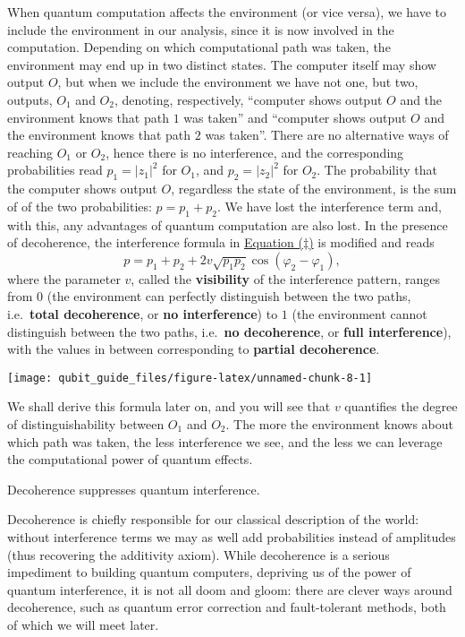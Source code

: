 \documentclass[fleqn]{article}
\newenvironment{idea}{\noindent}{\medskip}
\begin{document}
When quantum computation affects the environment (or vice versa), we have to include the environment in our analysis, since it is now involved in the computation.
Depending on which computational path was taken, the environment may end up in two distinct states.
The computer itself may show output \(O\), but when we include the environment we have not one, but two, outputs, \(O_1\) and \(O_2\), denoting, respectively, ``computer shows output \(O\) and the environment knows that path \(1\) was taken'' and ``computer shows output \(O\) and the environment knows that path \(2\) was taken''.
There are no alternative ways of reaching \(O_1\) or \(O_2\), hence there is no interference, and the corresponding probabilities read \(p_1=|z_1|^2\) for \(O_1\), and \(p_2=|z_2|^2\) for \(O_2\).
The probability that the computer shows output \(O\), regardless the state of the environment, is the sum of of the two probabilities: \(p=p_1+p_2\).
We have lost the interference term and, with this, any advantages of quantum computation are also lost.
In the presence of decoherence, the interference formula in \protect\hyperlink{the-double-slit-experiment}{Equation (\(\ddagger\))} is modified and reads
\[
p = p_1 + p_2 + 2 v \sqrt{p_1 p_2}\cos (\varphi_2-\varphi_1),
\]
where the parameter \(v\), called the \textbf{visibility} of the interference pattern, ranges from \(0\) (the environment can perfectly distinguish between the two paths, i.e.~\textbf{total decoherence}, or \textbf{no interference}) to \(1\) (the environment cannot distinguish between the two paths, i.e.~\textbf{no decoherence}, or \textbf{full interference}), with the values in between corresponding to \textbf{partial decoherence}.

\begin{center}\texttt{[image: qubit\_guide\_files/figure-latex/unnamed-chunk-8-1]} \end{center}

We shall derive this formula later on, and you will see that \(v\) quantifies the degree of distinguishability between \(O_1\) and \(O_2\).
The more the environment knows about which path was taken, the less interference we see, and the less we can leverage the computational power of quantum effects.

\begin{idea}
Decoherence suppresses quantum interference.

\end{idea}

Decoherence is chiefly responsible for our classical description of the world: without interference terms we may as well add probabilities instead of amplitudes (thus recovering the additivity axiom).
While decoherence is a serious impediment to building quantum computers, depriving us of the power of quantum interference, it is not all doom and gloom: there are clever ways around decoherence, such as quantum error correction and fault-tolerant methods, both of which we will meet later.
\end{document}

